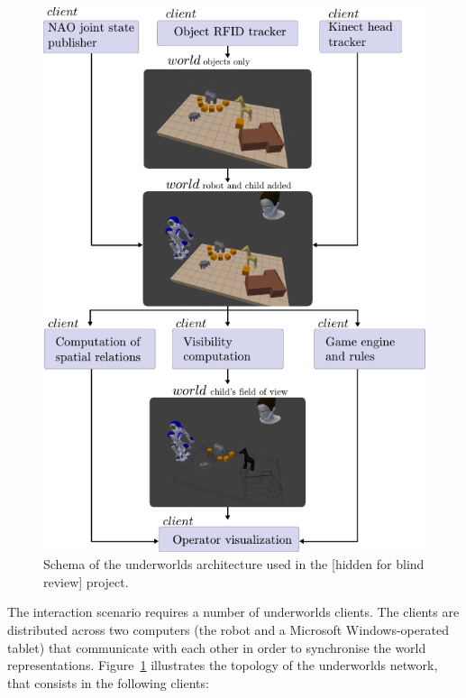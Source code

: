 \documentclass[conference]{IEEEtran}
\newcommand{\uwds}{{\sc underworlds}\xspace}
\begin{document}
\begin{figure}
    \centering
    \includegraphics[width=0.9\linewidth]{l2tor}
    \caption{Schema of the \uwds architecture used in the [hidden for blind review] project. }
    \label{fig|l2torarchitecture}
\end{figure}

The interaction scenario requires a number of \uwds clients. The clients are
distributed across two computers (the robot and a Microsoft Windows-operated
tablet) that communicate with each other in order to synchronise the world
representations. Figure~\ref{fig|l2torarchitecture} illustrates the topology of
the \uwds network, that consists in the following clients:
\end{document}
